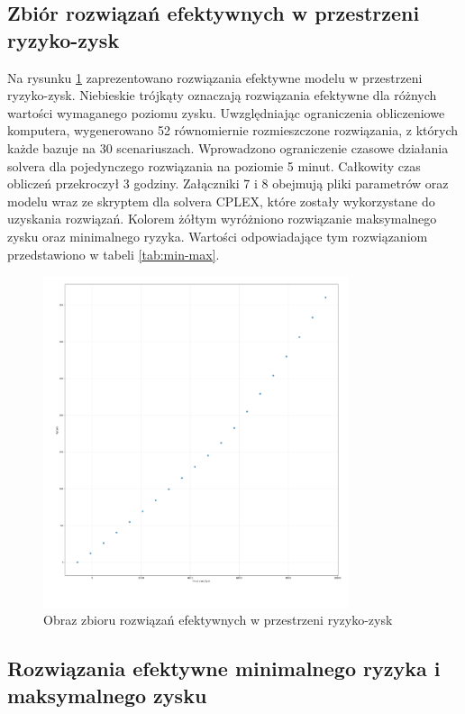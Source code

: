 \documentclass[11pt,a4paper]{article}
\begin{document}
\subsection{Zbiór rozwiązań efektywnych w przestrzeni ryzyko-zysk}
Na rysunku \ref{fig:profit-risk} zaprezentowano rozwiązania efektywne modelu w przestrzeni ryzyko-zysk. Niebieskie trójkąty oznaczają rozwiązania efektywne dla różnych wartości wymaganego poziomu zysku. Uwzględniając ograniczenia obliczeniowe komputera, wygenerowano 52 równomiernie rozmieszczone rozwiązania, z których każde bazuje na 30 scenariuszach. Wprowadzono ograniczenie czasowe działania solvera dla pojedynczego rozwiązania na poziomie 5 minut. Całkowity czas obliczeń przekroczył 3 godziny. Załączniki 7 i 8 obejmują pliki parametrów oraz modelu wraz ze skryptem dla solvera CPLEX, które zostały wykorzystane do uzyskania rozwiązań. Kolorem żółtym wyróżniono rozwiązanie maksymalnego zysku oraz minimalnego ryzyka. Wartości odpowiadające tym rozwiązaniom przedstawiono w tabeli \ref{tab:min-max}.
\begin{figure}[ht!]
\centering
\includegraphics[width=0.8\textwidth]{graphics/ryzyko_zysk_wykres.png}
\caption{Obraz zbioru rozwiązań efektywnych w przestrzeni ryzyko-zysk}
\label{fig:profit-risk}
\end{figure}

\subsection{Rozwiązania efektywne minimalnego ryzyka i maksymalnego zysku}
\end{document}
